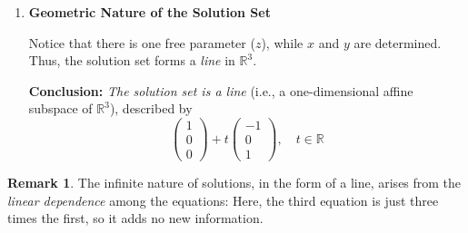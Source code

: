 \documentclass[12pt]{article}
\theoremstyle{definition}
\newtheorem{example}{Example}[section]
\newtheorem{remark}{Remark}[section]
\theoremstyle{plain}
\begin{document}
\begin{enumerate}[label=(\alph*)]
Thus, the general solution is:
\[
\boxed{
\begin{aligned}
x &= 1 - z \\
y &= 0 \\
z &= z \text{ (free)}
\end{aligned}
}
\]


Therefore, the complete solution set is
\[
\left\{
\begin{pmatrix}
1 - t \\
0 \\
t
\end{pmatrix}
: t \in \mathbb{R}
\right\}
\]
Alternatively,
\[
\begin{pmatrix}
1 \\
0 \\
0
\end{pmatrix}
+ t \begin{pmatrix}
-1 \\
0 \\
1
\end{pmatrix}, \quad t \in \mathbb{R}
\]

\begin{example}[Original Example]
    Let \( t = 0 \): \( (x, y, z) = (1, 0, 0) \).

    If \( t = 2 \): \( (x, y, z) = (1-2, 0, 2) = (-1, 0, 2) \).

    Both are solutions to the system.
\end{example}

\item \textbf{Geometric Nature of the Solution Set}

Notice that there is one free parameter (\( z \)), while \( x \) and \( y \) are determined. Thus, the solution set forms a \emph{line} in \( \mathbb{R}^3 \).

\vspace{0.5em}
\noindent\textbf{Conclusion:} \emph{The solution set is a line} (i.e., a one-dimensional affine subspace of \( \mathbb{R}^3 \)), described by
\[
\begin{pmatrix}
1 \\
0 \\
0
\end{pmatrix}
+ t \begin{pmatrix}
-1 \\
0 \\
1
\end{pmatrix}, \quad t \in \mathbb{R}
\]
\end{enumerate}

\begin{remark}
    The infinite nature of solutions, in the form of a line, arises from the \emph{linear dependence} among the equations: Here, the third equation is just three times the first, so it adds no new information.
\end{remark}
\end{document}
